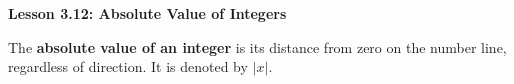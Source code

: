 \begin{center}
\textbf{Lesson 3.12: Absolute Value of Integers}
\end{center}

\vspace*{-1.5ex}

The \textbf{absolute value of an integer} is its distance from zero on the number line, regardless of direction. It is denoted by \(|x|\).



